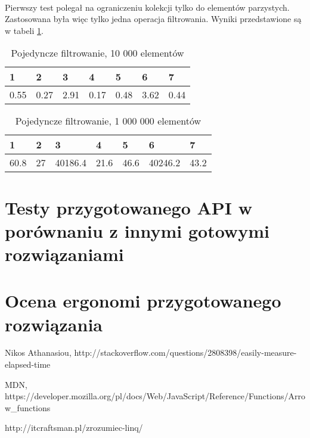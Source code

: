\documentclass[a4paper,10pt]{report}
\begin{document}
\paragraph{}
Pierwszy test polegał na ograniczeniu kolekcji tylko do elementów parzystych. Zastosowana była więc tylko jedna operacja filtrowania. Wyniki przedstawione są w tabeli \ref{tab1}.
\begin{table}[t]
	\caption{Pojedyncze filtrowanie, 10 000 elementów}
	\label{tab1}
\begin{tabular}{|l|l|l|l|l|l|l|}
	\hline 
	1 & 2 & 3 & 4 & 5 & 6 & 7\\
	\hline
	0.55 & 0.27 & 2.91 & 0.17 & 0.48 & 3.62 & 0.44\\
	\hline
\end{tabular} 
\end{table}

\begin{table}[t]
	\caption{Pojedyncze filtrowanie, 1 000 000 elementów}
	\label{tab2}
	\begin{tabular}{|l|l|l|l|l|l|l|}
		\hline 
		1 & 2 & 3 & 4 & 5 & 6 & 7\\
		\hline
		60.8 & 27 & 40186.4 & 21.6 & 46.6 & 40246.2 & 43.2\\
		\hline
	\end{tabular} 
\end{table}

\section{Testy przygotowanego API w porównaniu z innymi gotowymi rozwiązaniami}
\section{Ocena ergonomi przygotowanego rozwiązania}
\begin{thebibliography}{9}
	
	Nikos Athanasiou,
	http://stackoverflow.com/questions/2808398/easily-measure-elapsed-time
	
	MDN,
	https://developer.mozilla.org/pl/docs/Web/JavaScript/Reference/Functions/Arrow\_functions
	
	http://itcraftsman.pl/zrozumiec-linq/

	
\end{thebibliography}
\end{document}

